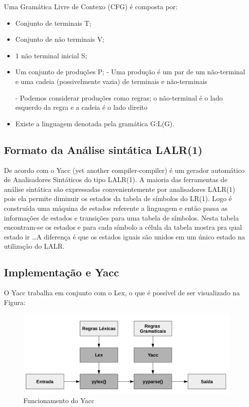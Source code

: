 \documentclass[12pt]{article}
\begin{document}
Uma Gramática Livre de Contexo (CFG) é composta por:  
\begin{itemize}
	\item Conjunto de terminais T; 
	\item Conjunto de não terminais V; 
	\item 1 não terminal inicial S; 
	\item Um conjunto de produções P;   
	\subitem
	- 	Uma produção é um par de um não-terminal e uma cadeia
	(possivelmente vazia) de terminais e não-terminais
	 
	\subitem -  
	Podemos considerar produções como regras; o não-terminal é o lado
	esquerdo da regra e a cadeia é o lado direito 
	\item Existe a linguagem denotada pela gramática G:L(G).
\end{itemize} 
\subsection{Formato da Análise sintática LALR(1)} 
De acordo com \cite{yacc} o Yacc (yet another compiler-compiler) é
um gerador automático de Analisadores Sintáticos do tipo LALR(1). A maioria das ferramentas de análise sintática são
expressadas convenientemente por analisadores LALR(1) pois ela permite diminuir os estados da tabela de símbolos do LR(1). Logo é construída uma máquina de estados referente a linguagem e então passa as informações de estados e transições para uma tabela de símbolos. Nesta tabela encontram-se os estados e para cada símbolo a célula da tabela mostra pra qual estado ir \dots A diferença é que os estados iguais são unidos em um único estado na utilização do LALR. 
\subsection{Implementação e Yacc} 
O Yacc trabalha em conjunto com o Lex, o que é possível de ser visualizado na Figura: 
\begin{figure}[H]  
	\centering 
	\caption{Funcionamento do Yacc} 
	\includegraphics[scale=0.4]{func}
\end{figure}  
  
\end{document}
